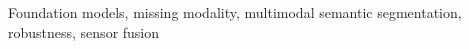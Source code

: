 \begin{abstract}
\end{abstract}

\begin{IEEEkeywords}
Foundation models, missing modality, multimodal semantic segmentation, robustness, sensor fusion
\end{IEEEkeywords}
